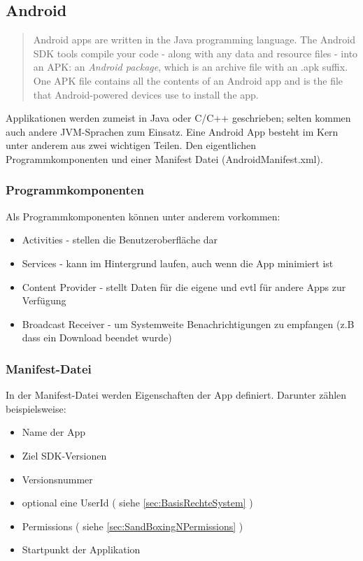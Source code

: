 \subsection{Android}\label{sec:app-android}
	\begin{quote}
	Android apps are written in the Java programming language. The Android SDK tools compile your code - along with any data and resource files - into an APK: an \textit{Android package}, which is an archive file with an .apk suffix. One APK file contains all the contents of an Android app and is the file that Android-powered devices use to install the app.\cite{AndroidApp}
	\end{quote}
	
\begin{flushleft}
	Applikationen werden zumeist in Java oder C/C++ geschrieben; selten kommen auch andere JVM-Sprachen zum Einsatz.
	Eine Android App besteht im Kern unter anderem aus zwei wichtigen Teilen. Den eigentlichen Programmkomponenten und einer Manifest Datei (AndroidManifest.xml).\\
\end{flushleft}
	\subsubsection{Programmkomponenten}
	Als Programmkomponenten können unter anderem vorkommen:
	\begin{itemize}\itemsep0pt
		\item Activities - stellen die Benutzeroberfläche dar
		\item Services - kann im Hintergrund laufen, auch wenn die App minimiert ist
		\item Content Provider - stellt Daten für die eigene und evtl für andere Apps zur Verfügung
		\item Broadcast Receiver - um Systemweite Benachrichtigungen zu empfangen (z.B dass ein Download beendet wurde)
	\end{itemize}
	\subsubsection{Manifest-Datei}
	In der Manifest-Datei werden Eigenschaften der App definiert. Darunter zählen beispielsweise:
	\begin{itemize}\itemsep0pt
		\item Name der App
		\item Ziel SDK-Versionen
		\item Versionsnummer
		\item optional eine UserId ( siehe \ref*{sec:BasisRechteSystem} )
		\item Permissions ( siehe \ref*{sec:SandBoxingNPermissions} )
		\item Startpunkt der Applikation
	\end{itemize}
